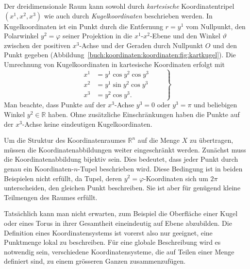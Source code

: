 \begin{beispiel}
\label{buch:koordinaten:koordinaten:beispiel:kartkugel}

Der dreidimensionale Raum kann sowohl durch {\em kartesische}
Koordinatentripel $(x^1,x^2,x^3)$ wie auch durch {\em Kugelkoordinaten}
%
beschrieben werden.
In Kugelkoordinaten ist ein Punkt durch die Entfernung $r=y^1$ vom
Nullpunkt, den Polarwinkel $y^2=\varphi$ seiner Projektion in die 
%
$x^1$-$x^2$-Ebene und den Winkel $\vartheta$ zwischen der positiven
$x^3$-Achse und der Geraden durch Nullpunkt $O$ und den Punkt gegeben
(Abbildung~\ref{buch:koordinaten:koordinaten:fig:kartkugel}).
Die Umrechnung von Kugelkoordinaten in kartesische Koordinaten
%
erfolgt mit
\begin{equation}
\left.
\begin{aligned}
x^1
&=
y^1 \cos y^2 \cos y^3 \\
x^2
&=
y^1 \sin y^2 \cos y^3 \\
x^3
&=
y^2 \cos y^3.
\end{aligned}
\qquad\right\}
\label{buch:koordinaten:koordinaten:eqn:kugelkartumrechnung}
\end{equation}
Man beachte, dass Punkte auf der $x^3$-Achse $y^3=0$ oder
$y^3=\pi$ und beliebigen Winkel $y^2\in\mathbb{R}$ haben.
Ohne zusätzliche Einschränkungen haben die Punkte auf der
$x^3$-Achse keine eindeutigen Kugelkoordinaten.
\end{beispiel}

Um die Struktur des Koordinatenraumes $\mathbb{R}^n$ auf die Menge
$X$ zu übertragen, müssen die Koordinatenabbildungen weiter eingeschränkt
werden.
Zunächst muss die Koordinatenabbildung bijektiv sein.
Dies bedeutet, dass jeder Punkt durch genau ein Koordinaten-$n$-Tupel
beschrieben wird.
Diese Bedingung ist in beiden Beispielen nicht erfüllt, da Tupel,
deren $y^2=\varphi$-Koordinaten sich um $2\pi$ unterscheiden, den
gleichen Punkt beschreiben.
Sie ist aber für genügend kleine Teilmengen des Raumes erfüllt.

Tatsächlich kann man nicht erwarten, zum Beispiel die Oberfläche einer
Kugel oder eines Torus in ihrer Gesamtheit eineindeutig auf Ebene
abzubilden.
Die Definition eines Koordinatensystems ist vorerst also nur geeignet,
eine Punktmenge lokal zu beschreiben.
Für eine globale Beschreibung wird es notwendig sein, verschiedene
Koordinatensysteme, die auf Teilen einer Menge definiert sind, zu
einem grösseren Ganzen zusammenzufügen.

